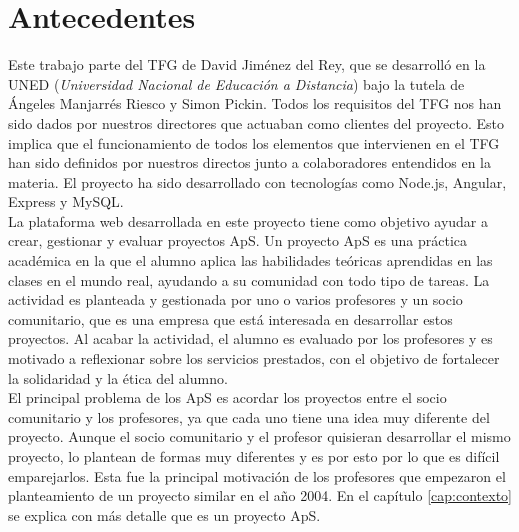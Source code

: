 \documentclass[11pt]{book}
\begin{document}
	\section{Antecedentes}
	Este trabajo parte del TFG de David Jiménez del Rey, que se desarrolló en la UNED (\emph{Universidad Nacional de Educación a Distancia}) bajo la tutela de Ángeles Manjarrés Riesco y Simon Pickin. Todos los requisitos del TFG nos han sido dados por nuestros directores que actuaban como clientes del proyecto. Esto implica que el funcionamiento de todos los elementos que intervienen en el TFG han sido definidos por nuestros directos junto a colaboradores entendidos en la materia. El proyecto ha sido desarrollado con tecnologías como Node.js, Angular, Express y MySQL.\\
	La plataforma web desarrollada en este proyecto tiene como objetivo ayudar a crear, gestionar y evaluar proyectos ApS. Un proyecto ApS es una práctica académica en la que el alumno aplica las habilidades teóricas aprendidas en las clases en el mundo real, ayudando a su comunidad con todo tipo de tareas. La actividad es planteada y gestionada por uno o varios profesores y un socio comunitario, que es una empresa que está interesada en desarrollar estos proyectos. Al acabar la actividad, el alumno es evaluado por los profesores y es motivado a reflexionar sobre los servicios prestados, con el objetivo de fortalecer la solidaridad y la ética del alumno. \\
	El principal problema de los ApS es acordar los proyectos entre el socio comunitario y los profesores, ya que cada uno tiene una idea muy diferente del proyecto. Aunque el socio comunitario y el profesor quisieran desarrollar el mismo proyecto, lo plantean de formas muy diferentes y es por esto por lo que es difícil emparejarlos. Esta fue la principal motivación de los profesores que empezaron el planteamiento de un proyecto similar en el año 2004. En el capítulo \ref{cap:contexto} se explica con más detalle que es un proyecto ApS.\\
\end{document}
